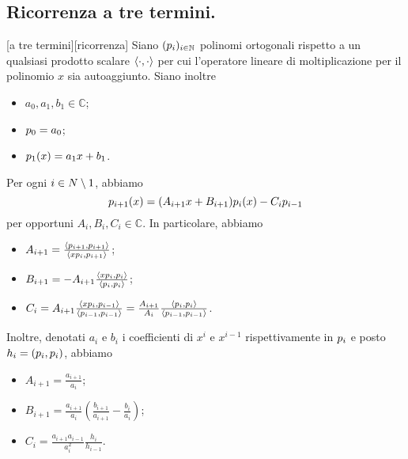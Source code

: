\subsection{Ricorrenza a tre termini.}
\label{IstituzioniDiAnalisiNumerica_PolinomiOrtogonali}
\begin{Theorem}
\label{IstituzioniDiAnalisiNumerica_RicorrenzaATreTermini}
	[a tre termini][ricorrenza] Siano $(p_i)_{i \in \mathbb{N}}$ polinomi ortogonali rispetto a un qualsiasi prodotto scalare $\left \langle \cdot , \cdot \right \rangle$ per cui l'operatore lineare di moltiplicazione per il polinomio $x$ sia autoaggiunto. Siano inoltre
	\begin{itemize}
		\item $a_0, a_1, b_1 \in \mathbb{C}$;
		\item $p_0 = a_0$;
		\item $p_1(x) = a_1x + b_1$.
	\end{itemize}
	Per ogni $i \in N \setminus 1$, abbiamo
	\[
	p_{i + 1}(x) = (A_{i + 1}x + B_{i + 1}) p_i(x) - C_i p_{i - 1}
	\]
	per opportuni $A_i, B_i, C_i \in \mathbb{C}$. In particolare, abbiamo
	\begin{itemize}
		\item $A_{i + 1} = \frac{\left \langle p_{i + 1} , p_{i + 1} \right \rangle}{\left \langle xp_i , p_{i + 1} \right \rangle}$;
		\item $B_{i + 1} = - A_{i + 1} \frac{\left \langle xp_i , p_i \right \rangle}{\left \langle p_i , p_i \right \rangle}$;
		\item $C_i = A_{i + 1} \frac{\left \langle xp_i , p_{i - 1} \right \rangle}{\left \langle p_{i - 1} , p_{i - 1} \right \rangle} = \frac{A_{i + 1}}{A_i} \frac{\left \langle p_i , p_i \right \rangle}{\left \langle p_{i - 1} , p_{i - 1} \right \rangle}$.
	\end{itemize}
	Inoltre, denotati $a_i$ e $b_i$ i coefficienti di $x^i$ e $x^{i - 1}$ rispettivamente in $p_i$ e posto $h_i = \left ( p_i , p_i \right )$, abbiamo
	\begin{itemize}
		\item $A_{i + 1} = \frac{a_{i + 1}}{a_i}$;
		\item $B_{i + 1} = \frac{a_{i + 1}}{a_i} \left ( \frac{b_{i + 1}}{a_{i + 1}} - \frac{b_i}{a_i} \right )$;
		\item $C_i = \frac{a_{i + 1}a_{i - 1}}{a_i^2} \frac{h_i}{h_{i - 1}}$.
	\end{itemize}
\end{Theorem}
